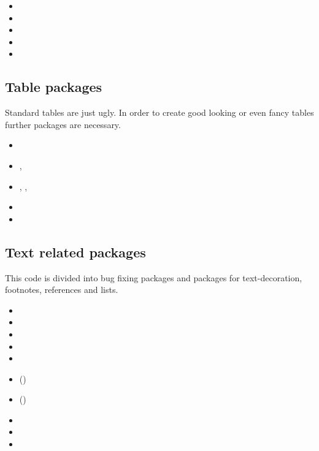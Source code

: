 \begin{itemize}[noitemsep]
\item {}
\item {}
\item {}
\item {}
\item {}
\end{itemize}


\subsection{Table packages}
Standard \latex tables are just ugly. In order to create good looking or even fancy tables further packages are necessary.

\begin{itemize}[noitemsep]
\item {}
\item {}, 
\item {}, , 
\item {}
\item {}
\end{itemize}
 

\subsection{Text related packages}

This code is divided into bug fixing packages and packages for text-decoration, footnotes, references and lists.

\begin{itemize}[noitemsep]
\item {}
\item {}
\item {}
\item {}
\item {}
\item ()
\item ()
\item {}
\item {}
\item {}
\end{itemize}

